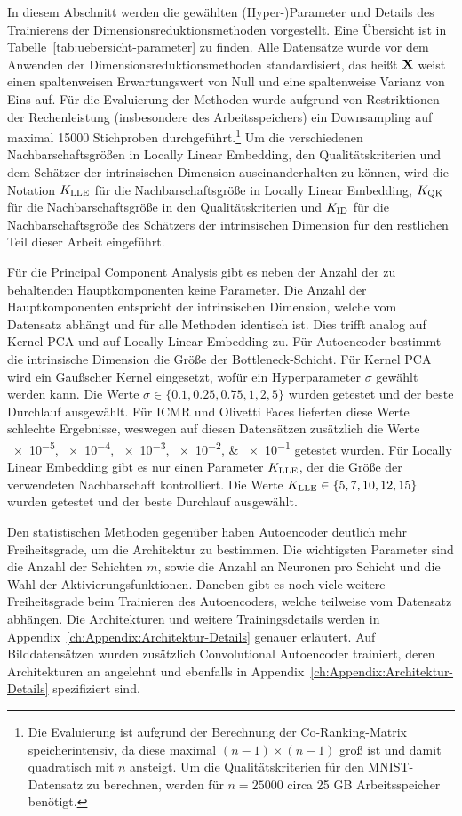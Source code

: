 In diesem Abschnitt werden die gewählten (Hyper-)Parameter und Details des Trainierens der
Dimensionsreduktionsmethoden vorgestellt. Eine Übersicht ist in
Tabelle~\ref{tab:uebersicht-parameter} zu finden. Alle Datensätze wurde vor dem Anwenden der
Dimensionsreduktionsmethoden standardisiert, das heißt $\mathbf{X}$ weist einen spaltenweisen
Erwartungswert von Null und eine spaltenweise Varianz von Eins auf. Für die Evaluierung der
Methoden wurde aufgrund von Restriktionen der Rechenleistung (insbesondere des Arbeitsspeichers)
ein Downsampling auf maximal \num{15000} Stichproben durchgeführt.\footnote{Die Evaluierung ist
	aufgrund der Berechnung der Co-Ranking-Matrix speicherintensiv, da diese maximal $(n-1) \times
		(n-1)$ groß ist und damit quadratisch mit $n$ ansteigt. Um die Qualitätskriterien für den
	MNIST-Datensatz zu berechnen, werden für $n=\num{25000}$ circa 25 GB Arbeitsspeicher benötigt.} Um
die verschiedenen Nachbarschaftsgrößen in Locally Linear Embedding, den Qualitätskriterien und dem
Schätzer der intrinsischen Dimension auseinanderhalten zu können, wird die Notation $K_{\text{LLE}}$ für die
Nachbarschaftsgröße in Locally Linear Embedding, $K_{\text{QK}}$ für die Nachbarschaftsgröße in den
Qualitätskriterien und $K_{\text{ID}}$ für die Nachbarschaftsgröße des Schätzers der intrinsischen Dimension
für den restlichen Teil dieser Arbeit eingeführt.

Für die Principal Component Analysis gibt es neben der Anzahl der zu behaltenden Hauptkomponenten
keine Parameter. Die Anzahl der Hauptkomponenten entspricht der intrinsischen Dimension, welche vom
Datensatz abhängt und für alle Methoden identisch ist. Dies trifft analog auf Kernel PCA und auf
Locally Linear Embedding zu. Für Autoencoder bestimmt die intrinsische Dimension die Größe der
Bottleneck-Schicht. Für Kernel PCA wird ein Gaußscher Kernel eingesetzt, wofür ein Hyperparameter
$\sigma$ gewählt werden kann. Die Werte $\sigma \in \{ 0.1, 0.25, 0.75, 1, 2, 5\}$ wurden getestet
und der beste Durchlauf ausgewählt. Für ICMR und Olivetti Faces lieferten diese Werte schlechte
Ergebnisse, weswegen auf diesen Datensätzen zusätzlich die Werte \numlist{e-5;e-4;e-3;e-2;e-1}
getestet wurden. Für Locally Linear Embedding gibt es nur einen Parameter $K_{\text{LLE}}$, der die Größe
der verwendeten Nachbarschaft kontrolliert. Die Werte $K_{\text{LLE}} \in \{ 5, 7, 10, 12, 15\}$ wurden
getestet und der beste Durchlauf ausgewählt.

Den statistischen Methoden gegenüber haben Autoencoder deutlich mehr Freiheitsgrade, um die
Architektur zu bestimmen. Die wichtigsten Parameter sind die Anzahl der Schichten $m$, sowie die
Anzahl an Neuronen pro Schicht und die Wahl der Aktivierungsfunktionen. Daneben gibt es noch viele
weitere Freiheitsgrade beim Trainieren des Autoencoders, welche teilweise vom Datensatz abhängen.
Die Architekturen und weitere Trainingsdetails werden in
Appendix~\ref{ch:Appendix:Architektur-Details} genauer erläutert. Auf Bilddatensätzen wurden
zusätzlich Convolutional Autoencoder trainiert, deren Architekturen an \textcite[14]{Ghosh.2019}
angelehnt und ebenfalls in Appendix~\ref{ch:Appendix:Architektur-Details} spezifiziert sind.


